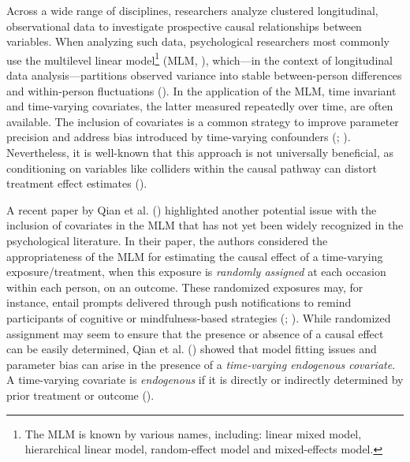\documentclass[
  11pt,
  a4paper,
]{article}
\begin{document}
Across a wide range of disciplines, researchers analyze clustered
longitudinal, observational data to investigate prospective causal
relationships between variables. When analyzing such data, psychological
researchers most commonly use the multilevel linear model\footnote{The
  MLM is known by various names, including: linear mixed model,
  hierarchical linear model, random-effect model and mixed-effects
  model.} (MLM, ),
which---in the context of longitudinal data analysis---partitions
observed variance into stable between-person differences and
within-person fluctuations (). In the application of the MLM, time invariant and
time-varying covariates, the latter measured repeatedly over time, are
often available. The inclusion of covariates is a common strategy to
improve parameter precision and address bias introduced by time-varying
confounders (;
). Nevertheless, it is well-known
that this approach is not universally beneficial, as conditioning on
variables like colliders within the causal pathway can distort treatment
effect estimates ().

A recent paper by Qian et al. ()
highlighted another potential issue with the inclusion of covariates in
the MLM that has not yet been widely recognized in the psychological
literature. In their paper, the authors considered the appropriateness
of the MLM for estimating the causal effect of a time-varying
exposure/treatment, when this exposure is \emph{randomly assigned} at
each occasion within each person, on an outcome. These randomized
exposures may, for instance, entail prompts delivered through push
notifications to remind participants of cognitive or mindfulness-based
strategies (;
). While randomized
assignment may seem to ensure that the presence or absence of a causal
effect can be easily determined, Qian et al.
() showed that model fitting issues and
parameter bias can arise in the presence of a \emph{time-varying
endogenous covariate}. A time-varying covariate is \emph{endogenous} if
it is directly or indirectly determined by prior treatment or outcome
().
\end{document}
